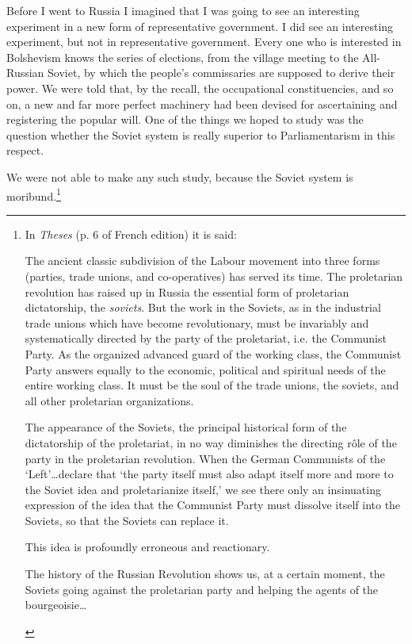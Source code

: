 Before I went to Russia I imagined that I was going to see an interesting experiment in a new form of representative government. I did see an interesting experiment, but not in representative government. Every one who is interested in Bolshevism knows the series of elections, from the village meeting to the All-Russian Soviet, by which the people's commissaries are supposed to derive their power. We were told that, by the recall, the occupational constituencies, and so on, a new and far more perfect machinery had been devised for ascertaining and registering the popular will. One of the things we hoped to study was the question whether the Soviet system is really superior to Parliamentarism in this respect.

We were not able to make any such study, because the Soviet system is moribund.\footnote{In \emph{Theses} (p. 6 of French edition) it is said: 
\begin{displayquote}
The ancient classic subdivision of the Labour movement into three forms (parties, trade unions, and co-operatives) has served its time. The proletarian revolution has raised up in Russia the essential form of proletarian dictatorship, the \emph{soviets}. But the work in the Soviets, as in the industrial trade unions which have become revolutionary, must be invariably and systematically directed by the party of the proletariat, i.e. the Communist Party. As the organized advanced guard of the working class, the Communist Party answers equally to the economic, political and spiritual needs of the entire working class. It must be the soul of the trade unions, the soviets, and all other proletarian organizations.

The appearance of the Soviets, the principal historical form of the dictatorship of the proletariat, in no way diminishes the directing rôle of the party in the proletarian revolution. When the German Communists of the `Left'\ldots declare that `the party itself must also adapt itself more and more to the Soviet idea and proletarianize itself,' we see there only an insinuating expression of the idea that the Communist Party must dissolve itself into the Soviets, so that the Soviets can replace it.

This idea is profoundly erroneous and reactionary.

The history of the Russian Revolution shows us, at a certain moment, the Soviets going against the proletarian party and helping the agents of the bourgeoisie\ldots


\end{displayquote}}
